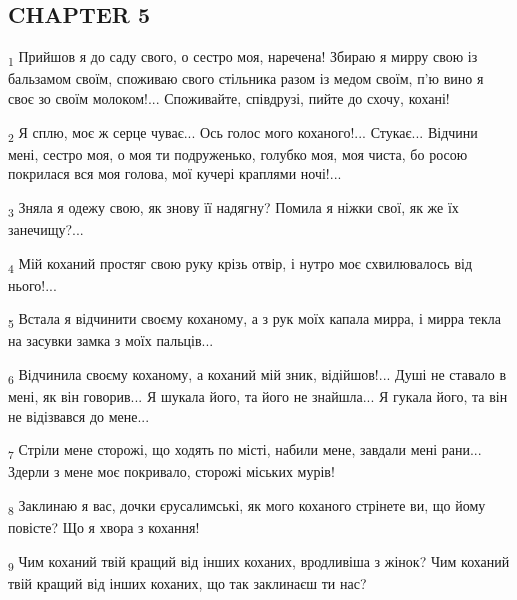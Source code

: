 \subsection{CHAPTER 5}
\begin{tcolorbox}
\textsubscript{1} Прийшов я до саду свого, о сестро моя, наречена! Збираю я мирру свою із бальзамом своїм, споживаю свого стільника разом із медом своїм, п'ю вино я своє зо своїм молоком!... Споживайте, співдрузі, пийте до схочу, кохані!
\end{tcolorbox}
\begin{tcolorbox}
\textsubscript{2} Я сплю, моє ж серце чуває... Ось голос мого коханого!... Стукає... Відчини мені, сестро моя, о моя ти подруженько, голубко моя, моя чиста, бо росою покрилася вся моя голова, мої кучері краплями ночі!...
\end{tcolorbox}
\begin{tcolorbox}
\textsubscript{3} Зняла я одежу свою, як знову її надягну? Помила я ніжки свої, як же їх занечищу?...
\end{tcolorbox}
\begin{tcolorbox}
\textsubscript{4} Мій коханий простяг свою руку крізь отвір, і нутро моє схвилювалось від нього!...
\end{tcolorbox}
\begin{tcolorbox}
\textsubscript{5} Встала я відчинити своєму коханому, а з рук моїх капала мирра, і мирра текла на засувки замка з моїх пальців...
\end{tcolorbox}
\begin{tcolorbox}
\textsubscript{6} Відчинила своєму коханому, а коханий мій зник, відійшов!... Душі не ставало в мені, як він говорив... Я шукала його, та його не знайшла... Я гукала його, та він не відізвався до мене...
\end{tcolorbox}
\begin{tcolorbox}
\textsubscript{7} Стріли мене сторожі, що ходять по місті, набили мене, завдали мені рани... Здерли з мене моє покривало, сторожі міських мурів!
\end{tcolorbox}
\begin{tcolorbox}
\textsubscript{8} Заклинаю я вас, дочки єрусалимські, як мого коханого стрінете ви, що йому повісте? Що я хвора з кохання!
\end{tcolorbox}
\begin{tcolorbox}
\textsubscript{9} Чим коханий твій кращий від інших коханих, вродливіша з жінок? Чим коханий твій кращий від інших коханих, що так заклинаєш ти нас?
\end{tcolorbox}
